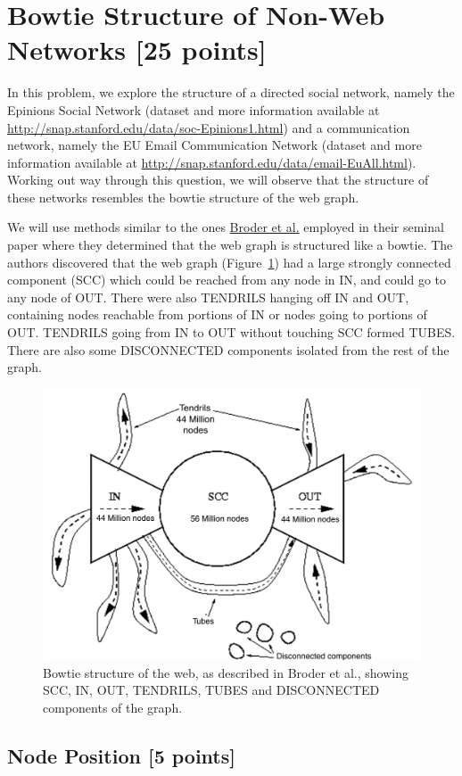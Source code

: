 
\section{Bowtie Structure of Non-Web Networks [25 points]}

In this problem, we explore the structure of a directed social network, namely the Epinions Social Network (dataset and more information available at \url{http://snap.stanford.edu/data/soc-Epinions1.html}) and a communication network, namely the EU Email Communication Network (dataset and more information available at \url{http://snap.stanford.edu/data/email-EuAll.html}). Working out way through this question, we will observe that the structure of these networks resembles the bowtie structure of the web graph.

We will use methods similar to the ones \href{http://snap.stanford.edu/class/cs224w-readings/broder00bowtie.pdf}{Broder et al.} employed in their seminal paper where they determined that the web graph is structured like a bowtie. The authors discovered that the web graph (Figure~\ref{fig:bowtie}) had a large strongly connected component (SCC) which could be reached from any node in IN, and could go to any node of OUT. There were also TENDRILS hanging off IN and OUT, containing nodes reachable from portions of IN or nodes going to portions of OUT. TENDRILS going from IN to OUT without touching SCC formed TUBES. There are also some DISCONNECTED components isolated from the rest of the graph.

\begin{figure}[!htb]
\centering
  \includegraphics[width=0.45\columnwidth]{web_bowtie.png}
  \caption{Bowtie structure of the web, as described in Broder et al., showing SCC, IN, OUT, TENDRILS, TUBES and DISCONNECTED components of the graph.}
  \label{fig:bowtie}
\end{figure}

\subsection{Node Position [5 points]}

